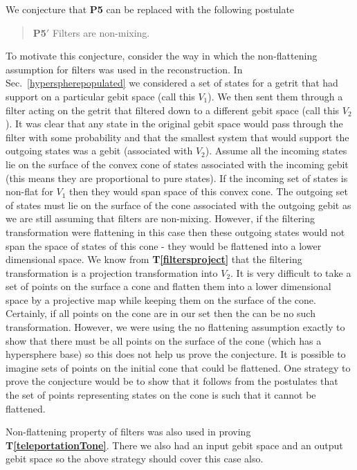 \documentclass[10pt]{article}
\begin{document}
We conjecture that {\bf P5} can be replaced with the following postulate
\begin{quote}
{\bf P5}$'$ Filters are non-mixing.
\end{quote}
To motivate this conjecture, consider the way in which the non-flattening assumption for filters was used in the reconstruction.  In Sec.\ \ref{hyperspherepopulated} we considered a set of states for a getrit that had support on a particular gebit space (call this $V_1$). We then sent them through a filter acting on the getrit that filtered down to a different gebit space (call this $V_2$).  It was clear that any state in the original gebit space would pass through the filter with some probability and that the smallest system that would support the outgoing states was a gebit (associated with $V_2$).  Assume all the incoming states lie on the surface of the convex cone of states associated with the incoming gebit (this means they are proportional to pure states).  If the incoming set of states is non-flat for $V_1$ then they would span space of this convex cone.  The outgoing set of states must lie on the surface of the cone associated with the outgoing gebit as we are still assuming that filters are non-mixing.  However, if the filtering transformation were flattening in this case then these outgoing states would not span the space of states of this cone - they would be flattened into a lower dimensional space.  We know from {\bf T\ref{filtersproject}} that the filtering transformation is a projection transformation into $V_2$.  It is very difficult to take a set of points on the surface a cone and flatten them into a lower dimensional space by a projective map while keeping them on the surface of the cone.  Certainly, if all points on the cone are in our set then the can be no such transformation.  However, we were using the no flattening assumption exactly to show that there must be all points on the surface of the cone (which has a hypersphere base) so this does not help us prove the conjecture.  It is possible to imagine sets of points on the initial cone that could be flattened.  One strategy to prove the conjecture would be to show that it follows from the postulates that the set of points representing states on the cone is such that it cannot be flattened.


Non-flattening property of filters was also used in proving {\bf T\ref{teleportationTone}}.  There we also had an input gebit space and an output gebit space so the above strategy should cover this case also.
\end{document}
